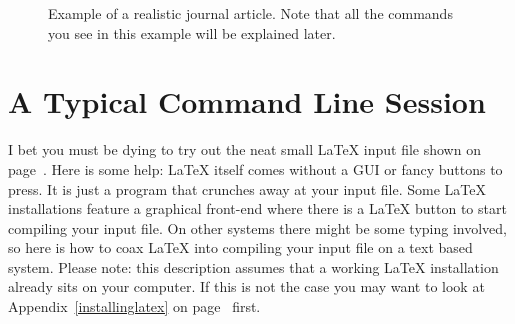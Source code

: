 \begin{figure}[htp]
  \begin{lined}{\textwidth}
  \end{lined}
  \caption[Example of a realistic journal article.]{Example of a realistic
    journal article. Note that all the commands you see in this example will be
    explained later.}\label{document}
\end{figure}

\section{A Typical Command Line Session}

I bet you must be dying to try out the neat small \LaTeX{} input file shown on
page~\pageref{mini}. Here is some help: \LaTeX{} itself comes without a GUI or
fancy buttons to press. It is just a program that crunches away at your input
file. Some \LaTeX{} installations feature a graphical front-end where there is
a \LaTeX{} button to start compiling your input file. On other systems there
might be some typing involved, so here is how to coax \LaTeX{} into compiling
your input file on a text based system. Please note: this description assumes
that a working \LaTeX{} installation already sits on your computer. If this is
not the case you may want to look at Appendix~\ref{installinglatex} on
page~\pageref{installinglatex} first.

